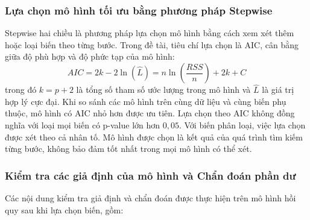	\subsubsection{Lựa chọn mô hình tối ưu bằng phương pháp Stepwise }
	
	Stepwise hai chiều là phương pháp lựa chọn mô hình bằng cách xem xét thêm hoặc loại biến theo từng bước. Trong đề tài, tiêu chí lựa chọn là AIC, cân bằng giữa độ phù hợp và độ phức tạp của mô hình:
	\begin{equation}
		AIC = 2k - 2\ln(\hat{L}) = n \ln\left(\frac{RSS}{n}\right) + 2k + C
	\end{equation}
	trong đó $k = p + 2$ là tổng số tham số ước lượng trong mô hình và $\hat{L}$ là giá trị hợp lý cực đại. Khi so sánh các mô hình trên cùng dữ liệu và cùng biến phụ thuộc, mô hình có AIC nhỏ hơn được ưu tiên. Lựa chọn theo AIC không đồng nghĩa với loại mọi biến có p-value lớn hơn $0{,}05$. Với biến phân loại, việc lựa chọn được xét theo cả nhân tố. Mô hình được chọn là kết quả của quá trình tìm kiếm từng bước, không bảo đảm tốt nhất trong mọi mô hình có thể xét.
	
	\subsubsection{Kiểm tra các giả định của mô hình và Chẩn đoán phần dư}
	
	Các nội dung kiểm tra giả định và chẩn đoán được thực hiện trên mô hình hồi quy sau khi lựa chọn biến, gồm:
	
